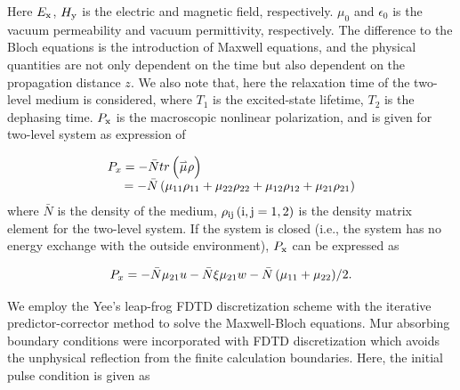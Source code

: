 \documentclass[10pt,letterpaper]{article}
\begin{document}
Here $ E_{\rm{x}} $, $ H_{\rm{y}} $ is the electric and magnetic field, respectively.  $ \mu_{0} $ and $ \epsilon_{0} $ is the vacuum permeability and vacuum permittivity, respectively. The difference to the Bloch equations is the introduction of Maxwell equations, and the physical quantities are not only dependent on the time but also dependent on the propagation distance $ z $. We also note that, here the relaxation time of the two-level medium is considered, where $T_{1}$ is the excited-state lifetime, $T_{2}$ is the dephasing time.  $ P_{\rm{x}} $ is the macroscopic nonlinear polarization, and is given for two-level system as expression of \cite{Pan-Ruiqin-Permanent-dipole-moment-2011}

\begin{equation}
\begin{array}{l}
{P_x} =  - \bar{N}tr\left( {\mathord{\buildrel{\lower3pt\hbox{$\scriptscriptstyle\rightharpoonup$}} 
		\over \mu } \rho } \right)\\
\;\;\;\;\: =  - \bar{N}\left( {{\mu _{11}}{\rho _{11}} + {\mu _{22}}{\rho _{22}} + {\mu _{12}}{\rho _{12}} + {\mu _{21}}{\rho _{21}}} \right)
\end{array}
\label{eq11}
\end{equation}
where $ \bar{N} $ is the density of the medium, ${\rho _{\rm{ij}}}\left( {\rm{i,j} = 1, 2} \right)$  is the density matrix element for the two-level system. If the system is closed (i.e., the system has no energy exchange with the outside environment),  $ P_{\rm{x}} $ can be expressed as

\begin{equation}
{P_x} =  - \bar{N}{\mu _{21}}u - \bar{N}\xi {\mu _{21}}w - {{\bar{N}\left( {{\mu _{11}} + {\mu _{22}}} \right)} \mathord{\left/
		{\vphantom {{N\left( {{\mu _{11}} + {\mu _{22}}} \right)} 2}} \right.
		\kern-\nulldelimiterspace} 2}.
\label{eq12}
\end{equation}

We employ the Yee's leap-frog FDTD discretization scheme \cite{Yee} with the iterative predictor-corrector method \cite{Ziolkowski-Two-Level-Method-PRA-1995} to solve the Maxwell-Bloch equations. Mur absorbing boundary conditions \cite{Mur-Absorption} were incorporated with FDTD discretization which avoids the unphysical reflection from the finite calculation boundaries. Here, the initial pulse condition is given as
\end{document}
